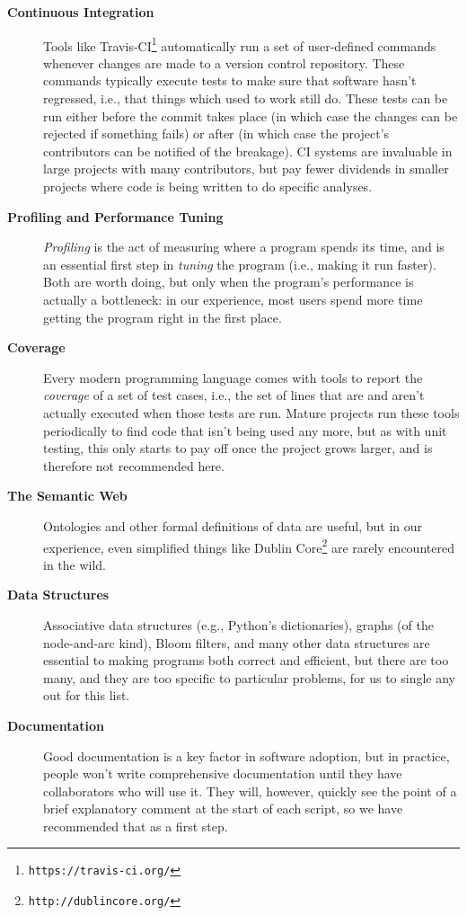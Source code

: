 \documentclass[10pt]{article}
\newcommand{\withurl}[2]{{#1}\footnote{\texttt{#2}}}
\begin{document}
\begin{description}
\item[\textbf{Continuous Integration}] Tools like
  \withurl{Travis-CI}{https://travis-ci.org/} automatically run a set of
  user-defined commands whenever changes are made to a version control
  repository. These commands typically execute tests to make sure that
  software hasn't regressed, i.e., that things which used to work
  still do. These tests can be run either before the commit takes
  place (in which case the changes can be rejected if something fails)
  or after (in which case the project's contributors can be notified
  of the breakage). CI systems are invaluable in large projects with
  many contributors, but pay fewer dividends in smaller projects where
  code is being written to do specific analyses.

\item[\textbf{Profiling and Performance Tuning}]
\emph{Profiling} is the act of measuring where a program spends its
time, and is an essential first step in \emph{tuning} the program (i.e.,
making it run faster). Both are worth doing, but only when the program's
performance is actually a bottleneck: in our experience, most users
spend more time getting the program right in the first place.

\item[\textbf{Coverage}]
Every modern programming language comes with tools to report the
\emph{coverage} of a set of test cases, i.e., the set of lines that are
and aren't actually executed when those tests are run. Mature projects
run these tools periodically to find code that isn't being used any
more, but as with unit testing, this only starts to pay off once the
project grows larger, and is therefore not recommended here.

\item[\textbf{The Semantic Web}] Ontologies and other formal
  definitions of data are useful, but in our experience, even
  simplified things like \withurl{Dublin Core}{http://dublincore.org/}
  are rarely encountered in the wild.

\item[\textbf{Data Structures}]
Associative data structures (e.g., Python's dictionaries), graphs (of
the node-and-arc kind), Bloom filters, and many other data structures
are essential to making programs both correct and efficient, but there
are too many, and they are too specific to particular problems, for us
to single any out for this list.

\item[\textbf{Documentation}]
Good documentation is a key factor in software adoption, but in
practice, people won't write comprehensive documentation until they have
collaborators who will use it. They will, however, quickly see the point
of a brief explanatory comment at the start of each script, so we have
recommended that as a first step.


\end{description}
\end{document}
